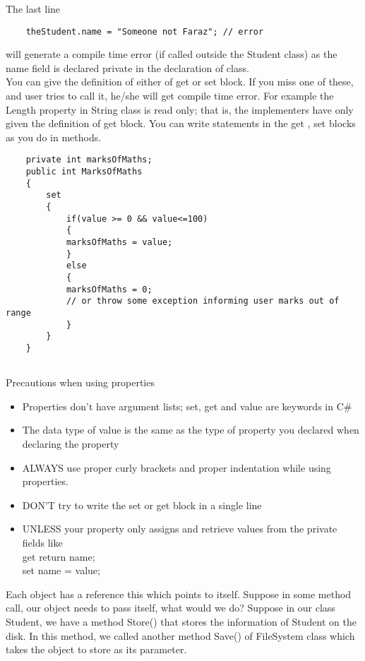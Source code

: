 The last line

\begin{lstlisting}
    theStudent.name = "Someone not Faraz"; // error    
\end{lstlisting}

will generate a compile time error (if called outside the Student class) as the name field is declared private in the
declaration of class.\\

You can give the definition of either of get { } or set { } block. If you miss one of these, and user tries to call it,
he/she will get compile time error. For example the Length property in String class is read only; that is, the
implementers have only given the definition of get { } block. You can write statements in the get { }, set { } blocks
as you do in methods.

\begin{lstlisting}
    private int marksOfMaths;
    public int MarksOfMaths
    {
        set
        {
            if(value >= 0 && value<=100)
            {
            marksOfMaths = value;
            }
            else
            {
            marksOfMaths = 0;
            // or throw some exception informing user marks out of range
            }
        }
    }
        
\end{lstlisting}

Precautions when using properties

\begin{itemize}
    \item  Properties don’t have argument lists; set, get and value are keywords in C\#
    \item  The data type of value is the same as the type of property you declared when declaring the property
    \item  ALWAYS use proper curly brackets { } and proper indentation while using properties.
    \item  DON’T try to write the set { } or get { } block in a single line
    \item  UNLESS your property only assigns and retrieve values from the private fields like\\
    get { return name; }\\
    set { name = value; }
\end{itemize}

Each object has a reference this which points to itself. Suppose in some method call, our object needs to pass itself,
what would we do? Suppose in our class Student, we have a method Store() that stores the information of Student
on the disk. In this method, we called another method Save() of FileSystem class which takes the object to store as
its parameter.


